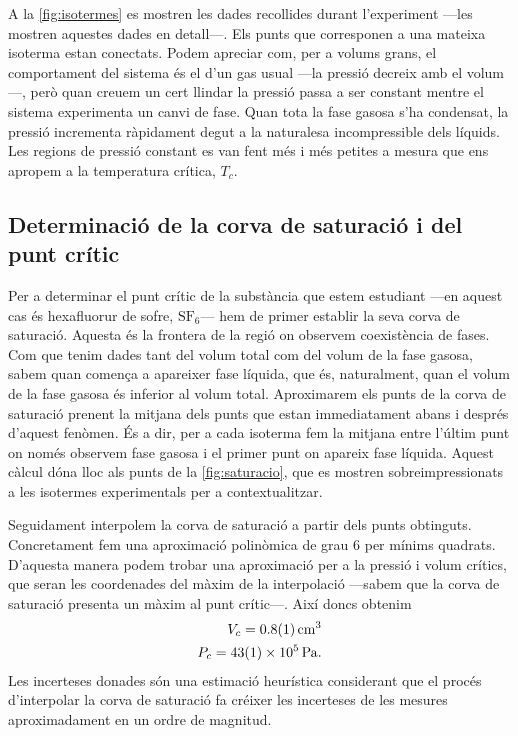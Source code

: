 \documentclass[12pt]{article}
\numberwithin{table}{section}
\numberwithin{figure}{section}
\numberwithin{equation}{section}
\newcommand{\data}[3]{\SI{#1 \pm #2}{#3}}
\begin{document}
A la \cref{fig:isotermes} es mostren les dades recollides durant l'experiment ---les  mostren aquestes dades en detall---. Els punts que corresponen a una mateixa isoterma estan conectats. Podem apreciar com, per a volums grans, el comportament del sistema és el d'un gas usual ---la pressió decreix amb el volum---, però quan creuem un cert llindar la pressió passa a ser constant mentre el sistema experimenta un canvi de fase. Quan tota la fase gasosa s'ha condensat, la pressió incrementa ràpidament degut a la naturalesa incompressible dels líquids. Les regions de pressió constant es van fent més i més petites a mesura que ens apropem a la temperatura crítica, \( T_c \).  

\subsection{Determinació de la corva de saturació i del punt crític} \label{sec:saturacio}
Per a determinar el punt crític de la substància que estem estudiant ---en aquest cas és hexafluorur de sofre, \( \mathrm{SF}_6 \)--- hem de primer establir la seva corva de saturació. Aquesta és la frontera de la regió on observem coexistència de fases. Com que tenim dades tant del volum total com del volum de la fase gasosa, sabem quan comença a apareixer fase líquida, que és, naturalment, quan el volum de la fase gasosa és inferior al volum total. Aproximarem els punts de la corva de saturació prenent la mitjana dels punts que estan immediatament abans i després d'aquest fenòmen. És a dir, per a cada isoterma fem la mitjana entre l'últim punt on només observem fase gasosa i el primer punt on apareix fase líquida. Aquest càlcul dóna lloc als punts de la \cref{fig:saturacio}, que es mostren sobreimpressionats a les isotermes experimentals per a contextualitzar.

Seguidament interpolem la corva de saturació a partir dels punts obtinguts. Concretament fem una aproximació polinòmica de grau 6 per mínims quadrats. D'aquesta manera podem trobar una aproximació per a la pressió i volum crítics, que seran les coordenades del màxim de la interpolació ---sabem que la corva de saturació presenta un màxim al punt crític---. Així doncs obtenim
\begin{equation} \label{eq:punt critic}
	\begin{aligned}
		V_c = \data{0.8}{0.1}{cm^3} \\
		P_c = \data{43}{1e5}{Pa}.
	\end{aligned}
\end{equation}
Les incerteses donades són una estimació heurística considerant que el procés d'interpolar la corva de saturació fa créixer les incerteses de les mesures aproximadament en un ordre de magnitud.
\end{document}
